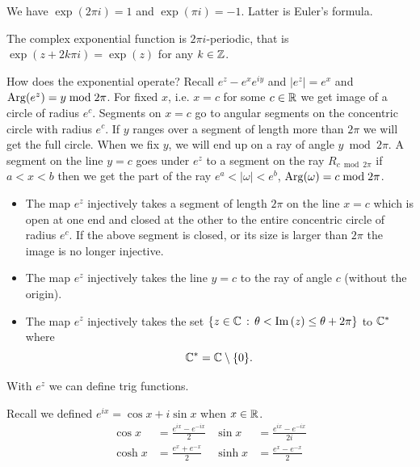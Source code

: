 \documentclass[10pt, a4paper]{article}
\begin{document}
\begin{corollary}
    We have $\exp(2\pi i) = 1$ and $\exp(\pi i) = -1$.
    Latter is Euler's formula.
\end{corollary}

\begin{corollary}
    The complex exponential function is $2\pi i$-periodic,
    that is $\exp(z + 2k\pi i) = \exp(z)$ for any $k \in \mathbb{Z}$.
\end{corollary}

How does the exponential operate?
Recall $e ^ z - e ^ xe ^ {iy}$ and $|e ^ z| = e ^ x$ and $\operatorname{Arg}(e ^ z) = y\bmod{2\pi}$.
For fixed $x$,
i.e. $x = c$ for some $c \in \mathbb{R}$ we get image of a circle of radius $e ^ c$.
Segments on $x = c$ go to angular segments on the concentric circle with radius $e ^ c$.
If $y$ ranges over a segment of length more than $2\pi$ we will get the full circle.
When we fix $y$,
we will end up on a ray of angle $y\bmod{2\pi}$.
A segment on the line $y = c$ goes under $e ^ z$ to a segment on the ray $R_{c\bmod{2\pi}}$ if $a < x < b$ then we get the part of the ray $e ^ a < |\omega| < e ^ b$,
$\operatorname{Arg}(\omega) = c\bmod{2\pi}$.

\begin{lemma}
    \begin{itemize}
        \item The map $e ^ z$ injectively takes a segment of length $2\pi$ on the line $x = c$ which is open at one end and closed at the other to the entire concentric circle of radius $e ^ c$.
        If the above segment is closed,
        or its size is larger than $2\pi$ the image is no longer injective.

        \item The map $e ^ z$ injectively takes the line $y = c$ to the ray of angle $c$
        (without the origin).

        \item The map $e ^ z$ injectively takes the set $\{z \in \mathbb{C}\,:\, \theta < \mathrm{Im}\,(z) \leq \theta + 2\pi\}$ to $\mathbb{C} ^ {*}$ where
        \[
        \mathbb{C} ^ {*} =  \mathbb{C} \setminus \{0\}.
        \]
    \end{itemize}
\end{lemma}
With $e ^ z$ we can define trig functions.

Recall we defined $e ^ {ix} = \cos{x} + i\sin{x}$ when $x \in \mathbb{R}$.
\begin{align*}
    \cos{x} &= \frac{e ^ {ix} - e ^ {-ix}}{2}&\sin{x} &= \frac{e ^ {ix} - e ^ {-ix}}{2i} \\
    \cosh{x} &= \frac{e ^ x + e ^ {-x}}{2}& \sinh{x} &= \frac{e ^ x - e ^ {-x}}{2}
\end{align*}
\end{document}
